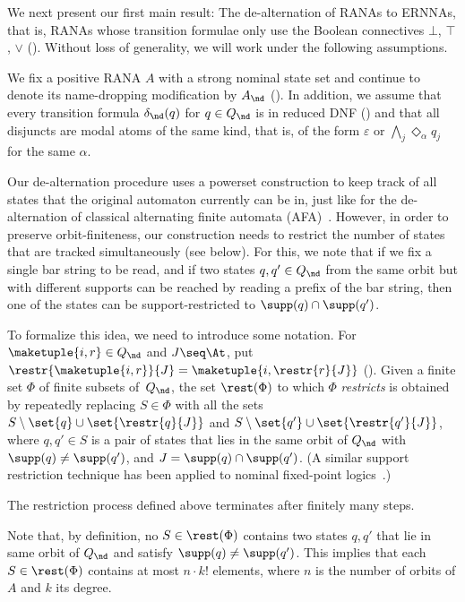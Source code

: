\documentclass[10pt, final, conference, a4paper, twocolumn]{IEEEtran}
\begin{document}
We next present our first main result: The de-alternation of RANAs to
ERNNAs, that is, RANAs whose transition formulae only use the Boolean connectives $\bot$, $\top$, $\vee$ ().
Without loss of generality, we will work under the following
assumptions.

\begin{assumption}\label{ass:ranalookslike}
  We fix a positive RANA $A$ with a strong nominal state set and continue to denote its name-dropping modification by $A_{\nd}$ ().
  In addition, we assume that every transition formula $\delta_{\nd}(q)$ for $q \in Q_{\nd}$ is in reduced DNF () and that all disjuncts are
  modal atoms of the same kind, that is, of the form $\varepsilon$ or $\bigwedge_j \Diamond_{\alpha} q_j$ for the same $\alpha$.
\end{assumption}



Our de-alternation procedure uses a powerset construction to keep track of all states that the original automaton currently can be in,
just like for the de-alternation of classical alternating finite automata (AFA)~\cite{fjy90}.
However, in order to preserve orbit-finiteness, our construction needs to restrict the number of states that are tracked simultaneously (see  below).
For this, we note that if we fix a single bar string to be read, and if two states $q, q' \in Q_{\nd}$ from the same orbit but with different
supports can be reached by reading a prefix of the bar string, then one of the states can be support-restricted to $\supp(q) \cap \supp(q')$.

To formalize this idea, we need to introduce some notation. For $\maketuple{i, r} \in Q_{\nd}$ and $J\seq \At$, put
$\restr{\maketuple{i, r}}{J}=\maketuple{i, \restr{r}{J}}$ ().
Given a finite set $\Phi$ of finite subsets of~$Q_{\nd}$, the set
$\rest(\Phi)$ to which $\Phi$ \emph{restricts} is obtained by
repeatedly replacing $S \in \Phi$ with all the sets
$S \setminus \set{q} \cup \set{\restr{q}{J}}$ and
$S\setminus \set{q'} \cup \set{\restr{q'}{J}}$, where $q, q' \in S$ is
a pair of states that lies in the same orbit of $Q_{\nd}$ with
$\supp(q)\neq \supp(q')$, and $J=\supp(q)\cap \supp(q')$. (A similar
support restriction technique has been applied to nominal fixed-point logics~\cite{hms21}.)

\begin{lem}\label{lem:rest-termination}
  The restriction process defined above terminates after finitely many steps. 
\end{lem}
\noindent
Note that, by definition, no $S \in \rest(\Phi)$ contains two states $q, q'$ that lie in same orbit of $Q_{\nd}$ and satisfy $\supp(q) \neq \supp(q')$.
This implies that each $S \in \rest(\Phi)$ contains at most $n \cdot k!$ elements, where $n$ is the number of orbits of $A$ and $k$ its degree.
\end{document}
